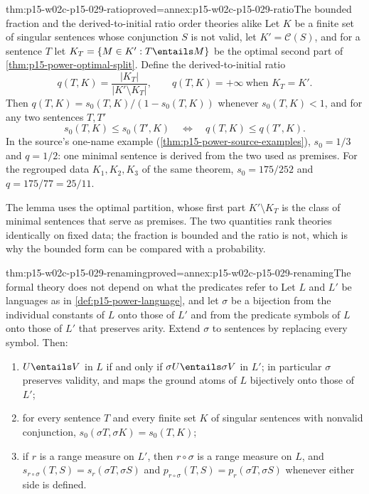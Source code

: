 \begin{hblemma}{thm:p15-w02c-p15-029-ratio}{proved=annex:p15-w02c-p15-029-ratio}{The bounded fraction and the derived-to-initial ratio order theories alike}
Let \(K\) be a finite set of singular sentences whose conjunction \(S\) is
not valid, let \(K'=\mathcal C(S)\), and for a sentence \(T\) let
\(K_T=\{M\in K':T\entails M\}\) be the optimal second part of
\cref{thm:p15-power-optimal-split}. Define the derived-to-initial ratio
\[
 q(T,K)=\frac{|K_T|}{|K'\setminus K_T|},
 \qquad q(T,K)=+\infty\ \text{when }K_T=K'.
\]
Then \(q(T,K)=s_0(T,K)/(1-s_0(T,K))\) whenever \(s_0(T,K)<1\), and for
any two sentences \(T,T'\)
\[
 s_0(T,K)\le s_0(T',K)\quad\Longleftrightarrow\quad q(T,K)\le q(T',K).
\]
In the source's one-name example
(\cref{thm:p15-power-source-examples}), \(s_0=1/3\) and \(q=1/2\): one
minimal sentence is derived from the two used as premises. For the
regrouped data \(K_1,K_2,K_3\) of the same theorem, \(s_0=175/252\) and
\(q=175/77=25/11\).
\end{hblemma}

The lemma uses the optimal partition, whose first part
\(K'\setminus K_T\) is the class of minimal sentences that serve as
premises. The two quantities rank theories identically on fixed data; the
fraction is bounded and the ratio is not, which is why the bounded form
can be compared with a probability.

\begin{hbtheorem}{thm:p15-w02c-p15-029-renaming}{proved=annex:p15-w02c-p15-029-renaming}{The formal theory does not depend on what the predicates refer to}
Let \(L\) and \(L'\) be languages as in \cref{def:p15-power-language},
and let \(\sigma\) be a bijection from the individual constants of \(L\)
onto those of \(L'\) and from the predicate symbols of \(L\) onto those
of \(L'\) that preserves arity. Extend \(\sigma\) to sentences by
replacing every symbol. Then:
\begin{enumerate}
\item \(U\entails V\) in \(L\) if and only if \(\sigma U\entails\sigma V\)
  in \(L'\); in particular \(\sigma\) preserves validity, and maps the
  ground atoms of \(L\) bijectively onto those of \(L'\);
\item for every sentence \(T\) and every finite set \(K\) of singular
  sentences with nonvalid conjunction,
  \(s_0(\sigma T,\sigma K)=s_0(T,K)\);
\item if \(r\) is a range measure on \(L'\), then \(r\circ\sigma\) is a
  range measure on \(L\), and
  \(s_{r\circ\sigma}(T,S)=s_r(\sigma T,\sigma S)\) and
  \(p_{r\circ\sigma}(T,S)=p_r(\sigma T,\sigma S)\) whenever either side
  is defined.
\end{enumerate}
\end{hbtheorem}

